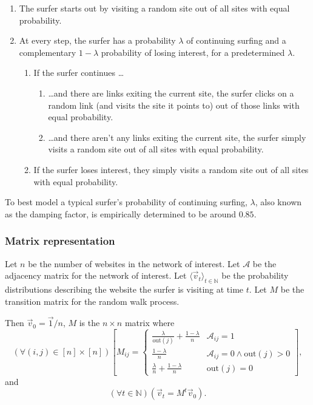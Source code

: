 \documentclass[12pt, titlepage, twoside]{amsart}
\newcommand{\N}{\ensuremath{\mathbb N}}
\begin{document}
\begin{enumerate}
  \item The surfer starts out by visiting a random site out of all sites with equal probability.
  \item At every step, the surfer has a probability $\lambda$ of continuing surfing and a complementary
    $1 - \lambda$ probability of losing interest, for a predetermined $\lambda$.
  
    \begin{enumerate}
      \item If the surfer continues \ldots

        \begin{enumerate}
          \item \ldots and there are links exiting the current site, the surfer
            clicks on a random link (and visits the site it points to) out of those links with equal probability.
          \item \ldots and there aren't any links exiting the current site, the surfer simply
            visits a random site out of all sites with equal probability.
        \end{enumerate}

      \item If the surfer loses interest, they simply visits a random site out of all sites with equal probability.
    \end{enumerate}

\end{enumerate}

To best model a typical surfer's probability of continuing surfing, $\lambda$, also known as the damping factor,
is empirically determined to be around $0.85$.

\subsubsection{Matrix representation}

Let $n$ be the number of websites in the network of interest.
Let $\mathcal{A}$ be the adjacency matrix for the network of interest.
Let $\langle\vec{v}_{t}\rangle_{t\in\N}$ be the probability distributions describing the
website the surfer is visiting at time $t$.
Let $M$ be the transition matrix for the random walk process.

Then $\vec{v}_0 = \vec{1} / n$,
$M$ is the $n\times n$ matrix where
\[
  (\forall (i, j)\in[n]\times[n])
  \left[
  M_{ij} =
  \begin{cases}
    \frac{\lambda}{\mathrm{out}(j)} + \frac{1 - \lambda}{n}
    & \mathcal{A}_{ij} = 1 \\
    \frac{1 - \lambda}{n}
    & \mathcal{A}_{ij} = 0\wedge\mathrm{out}(j) > 0 \\
    \frac{\lambda}{n} + \frac{1 - \lambda}{n}
    & \mathrm{out}(j) = 0
  \end{cases}
  \right],
\]
and
\[
  (\forall t\in\N)\left(\vec{v}_t = M^t\vec{v}_0\right).
\]
\end{document}
